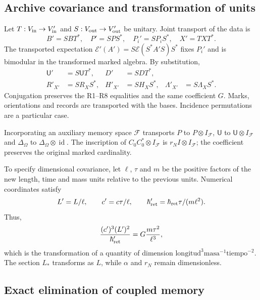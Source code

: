 \subsection{Archive covariance and transformation of units}

Let \(T:V_{\rm in}\to V'_{\rm in}\) and \(S:V_{\rm out}\to V'_{\rm out}\) be unitary. Joint transport of the data is
\[
 B'=SBT^*,\quad P'=SPS^*,\quad P_i'=SP_iS^*,\quad X'=TXT^*.
\]
The transported expectation \(\mathcal E'(A')=S\mathcal E(S^*A'S)S^*\) fixes \(P_i'\) and is bimodular in the transformed marked algebra. By substitution,
\begin{align*}
 \mathsf U'&=S\mathsf UT^*,&D'&=SDT^*,\\
 R'_{X'}&=SR_XS^*,&H'_{X'}&=SH_XS^*,&
 \Lambda'_{X'}&=S\Lambda_XS^*.
\end{align*}
Conjugation preserves the R1--R8 equalities and the same coefficient \(G\). Marks, orientations and records are transported with the bases. Incidence permutations are a particular case.

Incorporating an auxiliary memory space \(\mathcal F\) transports \(P\) to \(P\otimes I_{\mathcal F}\), \(\mathsf U\) to \(\mathsf U\otimes I_{\mathcal F}\) and \(\Delta_\Omega\) to \(\Delta_\Omega\otimes\operatorname{id}\). The inscription of \(C_0C_0^*\otimes I_{\mathcal F}\) is \(r_N I\otimes I_{\mathcal F}\); the coefficient preserves the original marked cardinality.

To specify dimensional covariance, let \(\ell\), \(\tau\) and \(m\) be the positive factors of the new length, time and mass units relative to the previous units. Numerical coordinates satisfy
\[
 L'=L/\ell,\qquad c'=c\tau/\ell,\qquad
 \hbar'_{\rm ret}=\hbar_{\rm ret}\tau/(m\ell^2).
\]
Thus,
\[
 \frac{(c')^3(L')^2}{\hbar'_{\rm ret}}
 =G\frac{m\tau^2}{\ell^3},
\]
which is the transformation of a quantity of dimension \(\mathrm{longitud}^3\mathrm{masa}^{-1}\mathrm{tiempo}^{-2}\). The section \(L_*\) transforms as \(L\), while \(\alpha\) and \(r_N\) remain dimensionless.

\subsection{Exact elimination of coupled memory}

